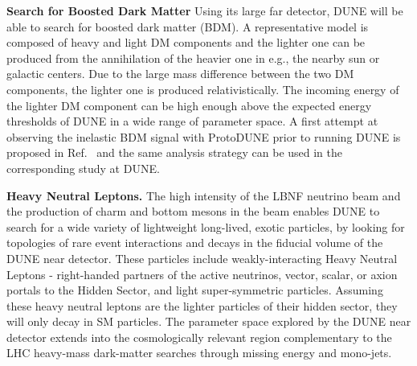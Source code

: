 {\bf Search for Boosted Dark Matter}
Using its large far detector, DUNE will be able to search for boosted dark matter (BDM).
A representative model is composed of heavy and light DM components and the lighter one can be produced from the annihilation of the heavier one in e.g., the nearby sun or galactic centers.
Due to the large mass difference between the two DM components, the lighter one is produced relativistically.
The incoming energy of the lighter DM component can be high enough above the expected energy thresholds of DUNE in a wide range of parameter space. 
A first attempt at observing the inelastic BDM signal with ProtoDUNE prior to running DUNE is proposed in Ref.~\cite{Chatterjee:2018mej} and the same analysis strategy can be used in the corresponding study at DUNE.

{\bf Heavy Neutral Leptons.}
The high intensity of the LBNF neutrino beam and the production of charm and bottom mesons in the beam enables DUNE to search for a wide variety of lightweight long-lived, exotic particles, by looking for topologies of rare event interactions and decays in the fiducial volume of the DUNE near detector. These particles include weakly-interacting Heavy Neutral Leptons - right-handed partners of the active neutrinos, vector, scalar, or axion portals to the Hidden Sector, and light super-symmetric particles.  
Assuming these heavy neutral leptons are the lighter particles of their hidden sector, they will only decay in SM particles.
The parameter space explored by the DUNE near detector extends into the cosmologically relevant region complementary to the LHC heavy-mass dark-matter searches through missing energy and mono-jets. 

